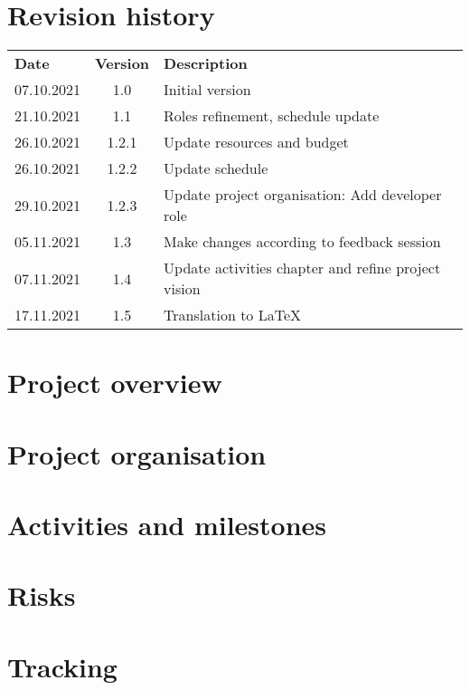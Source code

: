 \documentclass[hidelinks]{report}
\begin{document}
	\maketitle

	\chapter*{Revision history}

	\begin{table}[H]
		\centering
		\begin{tabularx}{\textwidth}{ l c X }
			\rowcolor[HTML]{C0C0C0}
			\textbf{Date} & \textbf{Version} & \textbf{Description} \\
			07.10.2021 & 1.0   & Initial version \\
			\rowcolor[HTML]{E7E7E7}
			21.10.2021 & 1.1   & Roles refinement, schedule update \\
			26.10.2021 & 1.2.1 & Update resources and budget \\
			\rowcolor[HTML]{E7E7E7}
			26.10.2021 & 1.2.2 & Update schedule \\
			29.10.2021 & 1.2.3 & Update project organisation: Add developer role \\
			\rowcolor[HTML]{E7E7E7}
			05.11.2021 & 1.3   & Make changes according to feedback session \\
			07.11.2021 & 1.4   & Update activities chapter and refine project vision \\
			\rowcolor[HTML]{E7E7E7}
			17.11.2021 & 1.5   & Translation to LaTeX \\
		\end{tabularx}
	\end{table}

	\tableofcontents

	\chapter{Project overview}\label{chp:overview}
	\thispagestyle{fancy}
	

	\chapter{Project organisation}\label{chp:organisation}
	\thispagestyle{fancy}
	

	\chapter{Activities and milestones}\label{chp:activities}
	\thispagestyle{fancy}
	

	\chapter{Risks}\label{chp:risks}
	\thispagestyle{fancy}
	

	\chapter{Tracking}\label{chp:tracking}
	\thispagestyle{fancy}
	
\end{document}
